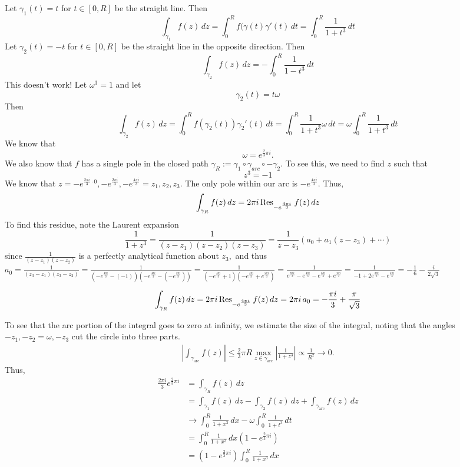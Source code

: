 \documentclass[11pt]{article}
\begin{document}
\begin{enumerate}
\begin{solution}
Let $\gamma_1(t) = t$ for $t \in [0,R]$ be the straight line. Then 
\[\int_{\gamma_1} f(z)\,dz = \int_0^R f(\gamma(t)\gamma'(t)\,dt = \int_0^R \frac{1}{1 + t^3}\,dt\]
Let $\gamma_2(t) = -t$ for $t\in [0,R]$ be the straight line in the opposite direction. Then 
\[\int_{\gamma_2} f(z)\,dz = - \int_0^R \frac{1}{1 - t^3}\,dt\]
This doesn't work!
Let $\omega^3 = 1$ and let 
\[\gamma_2(t) = t\omega\] Then 
\[\int_{\gamma_2}f(z)\,dz = \int_{0}^R f(\gamma_2(t))\gamma_2'(t)\,dt = \int_0^R \frac{1}{1 + t^3} \omega \,dt = \omega \int_0^R \frac{1}{1 + t^3}\,dt\]
We know that 
\[\omega = e^{\frac{2}{3}\pi i}.\] We also know that $f$ has a single pole in the closed path $\gamma_R := \gamma_1 \circ \gamma_{arc} \circ - \gamma_2.$ To see this, we need to find $z$ such that 
\[z^3 = -1\] We know that $z = -e^{\frac{2\pi i}{3} \cdot 0}, -e^{\frac{2\pi i}{3}}, -e^{\frac{4\pi i}{3}} = z_1, z_2, z_3.$ The only pole within our arc is $-e^{\frac{4\pi i}{3}}.$ Thus, 
\[\int_{\gamma_R} f(z)\,dz = 2\pi i \Res_{-e^{\frac{4\pi i}{3}}}f(z)\,dz\] To find this residue, note the Laurent expansion
\[\frac{1}{1 + z^3} = \frac{1}{(z - z_1)(z - z_2)(z - z_3)}= \frac{1}{z-z_3}(a_0 + a_1 (z -z_3) + \cdots)\] since $\frac{1}{(z-z_1)(z - z_2)}$ is a perfectly analytical function about $z_3,$ and thus 
$a_0 = \frac{1}{(z_3 - z_1)(z_3 - z_2)} = \frac{1}{(-e^{\frac{4\pi i}{3}}- (-1))(-e^{\frac{4\pi i}{3}}-(-e^{\frac{2\pi i}{3}}))} = \frac{1}{(-e^{\frac{4\pi i}{3}} + 1)(-e^{\frac{4\pi i}{3}} + e^{\frac{2\pi i}{3}})}= \frac{1}{e^{\frac{8\pi i}{3}} -e^{\frac{4\pi i}{3}} - e^{\frac{6\pi i}{3}}+ e^{\frac{2\pi i}{3}}} = \frac{1}{-1 + 2e^{\frac{2\pi i}{3}} - e^{\frac{4\pi i}{3}}} = -\frac{1}{6} - \frac{i}{2\sqrt{3}}$

\[\int_{\gamma_R} f(z)\,dz = 2\pi i \Res_{-e^{\frac{4\pi i}{3}}}f(z)\,dz = 2\pi i \,a_0 = -\frac{\pi i}{3} + \frac{\pi}{\sqrt{3}}\]

To see that the arc portion of the integral goes to zero at infinity, we estimate the size of the integral, noting that the angles $-z_1, -z_2 = \omega, -z_3$ cut the circle into three parts.   
\begin{align*}
    \left|\int_{\gamma_{\text{arc}}} f(z)\right| \leq \frac{2}{3}\pi R \max_{z \in \gamma_{\text{arc}}}|\frac{1}{1+ z^3}| \propto \frac{1}{R^2}\to 0.
\end{align*}
Thus, 
\begin{align*}
    \frac{2\pi i}{3}e^{\frac{2}{3}\pi i}&=\int_{\gamma_R}f(z)\,dz\\ &= \int_{\gamma_{1}} f(z)\,dz - \int_{\gamma_2} f(z)\,dz + \int_{\gamma_{\text{arc}}}f(z)\,dz\\
    &\to \int_0^R \frac{1}{1 + x^3}\,dx - \omega\int_{0}^R \frac{1}{1 + t^3}\,dt\\
    &= \int_0^R \frac{1}{1 + x^3}\,dx\left(1 - e^{\frac{2}{3}\pi i}\right)\\
    &= \left(1 - e^{\frac{2}{3}\pi i}\right)\int_0^R \frac{1}{1 + x^3}\,dx
\end{align*}


\end{solution}
\end{enumerate}
\end{document}
